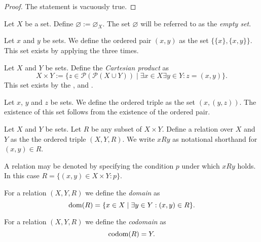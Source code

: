 \documentclass[../../main.tex]{subfiles}
\begin{document}
\begin{proof}
    The statement is vacuously true.
\end{proof}
\begin{definition}
    Let $X$ be a set. Define $\varnothing:=\varnothing_X$. The set $\varnothing$ will be referred to as the \emph{empty set}.
\end{definition}
\begin{notation}
    Let $x$ and $y$ be sets. We define the ordered pair $(x,y)$ as the set $\{\{x\},\{x,y\}\}$. This set exists by applying the  three times.
\end{notation}
\begin{notation}
    Let $X$ and $Y$ be sets. Define the \emph{Cartesian product} as
    \begin{equation*}
        X\times Y:=\{z\in\mathcal{P}(\mathcal{P}(X\cup Y))\mid\exists x\in X\exists y\in Y:z=(x,y)\}.
    \end{equation*}
    This set exists by the ,  and .
\end{notation}
\begin{notation}
    Let $x$, $y$ and $z$ be sets. We define the ordered triple as the set $(x,(y,z))$. The existence of this set follows from the existence of the ordered pair.
\end{notation}
\begin{definition}[Relation]
    Let $X$ and $Y$ be sets. Let $R$ be any subset of $X\times Y$. Define a relation over $X$ and $Y$ as the the ordered triple $(X,Y,R)$. We write $xRy$ as notational shorthand for $(x,y)\in R$.

    A relation may be denoted by specifying the condition $p$ under which $xRy$ holds. In this case $R=\{(x,y)\in X\times Y:p\}$.
\end{definition}
\begin{notation}[Domain]
    For a relation $(X,Y,R)$ we define the \emph{domain} as
    \begin{equation*}
        \operatorname{dom}(R)=\{x\in X\mid\exists y\in Y:(x,y)\in R\}.
    \end{equation*}
\end{notation}
\begin{notation}[Codomain]
    For a relation $(X,Y,R)$ we define the \emph{codomain} as
    \begin{equation*}
        \operatorname{codom}(R)=Y.
    \end{equation*}
\end{notation}
\end{document}
